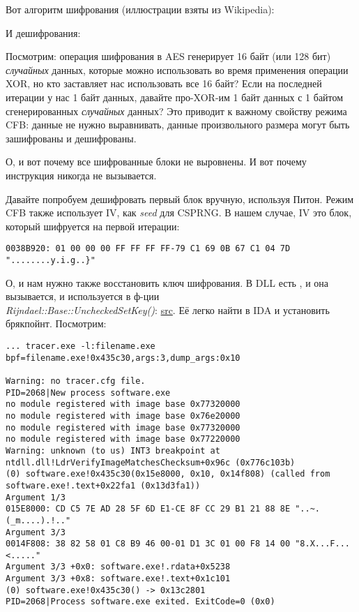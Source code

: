 Вот алгоритм шифрования (иллюстрации взяты из Wikipedia):

\begin{figure}[H]
\centering
{}
\end{figure}

И дешифрования:

\begin{figure}[H]
\centering
{}
\label{fig:CFB_decryption}
\end{figure}

Посмотрим: операция шифрования в AES генерирует 16 байт (или 128 бит) \emph{случайных} данных,
которые можно использовать во время применения операции XOR, но кто заставляет нас использовать все 16 байт?
Если на последней итерации у нас 1 байт данных, давайте про-XOR-им 1 байт данных с 1 байтом сгенерированных
\emph{случайных} данных?
Это приводит к важному свойству режима \ac{CFB}: данные не нужно выравнивать, данные произвольного размера
могут быть зашифрованы и дешифрованы.

О, и вот почему все шифрованные блоки не выровнены.
И вот почему инструкция  никогда не вызывается.

Давайте попробуем дешифровать первый блок вручную, используя Питон.
Режим \ac{CFB} также использует \ac{IV}, как \emph{seed} для \ac{CSPRNG}.
В нашем случае, \ac{IV} это блок, который шифруется на первой итерации:

\begin{lstlisting}
0038B920: 01 00 00 00 FF FF FF FF-79 C1 69 0B 67 C1 04 7D "........y.i.g..}"
\end{lstlisting}

О, и нам нужно также восстановить ключ шифрования.
В DLL есть , и она вызывается, и используется в ф-ции \\
\emph{Rijndael::Base::UncheckedSetKey()}:
\href{https://github.com/mmoss/cryptopp/blob/2772f7b57182b31a41659b48d5f35a7b6cedd34d/src/rijndael.cpp#L198}{src}.
Её легко найти в IDA и установить брякпойнт. Посмотрим:

\begin{lstlisting}
... tracer.exe -l:filename.exe bpf=filename.exe!0x435c30,args:3,dump_args:0x10

Warning: no tracer.cfg file.
PID=2068|New process software.exe
no module registered with image base 0x77320000
no module registered with image base 0x76e20000
no module registered with image base 0x77320000
no module registered with image base 0x77220000
Warning: unknown (to us) INT3 breakpoint at ntdll.dll!LdrVerifyImageMatchesChecksum+0x96c (0x776c103b)
(0) software.exe!0x435c30(0x15e8000, 0x10, 0x14f808) (called from software.exe!.text+0x22fa1 (0x13d3fa1))
Argument 1/3
015E8000: CD C5 7E AD 28 5F 6D E1-CE 8F CC 29 B1 21 88 8E "..~.(_m....).!.."
Argument 3/3
0014F808: 38 82 58 01 C8 B9 46 00-01 D1 3C 01 00 F8 14 00 "8.X...F...<....."
Argument 3/3 +0x0: software.exe!.rdata+0x5238
Argument 3/3 +0x8: software.exe!.text+0x1c101
(0) software.exe!0x435c30() -> 0x13c2801
PID=2068|Process software.exe exited. ExitCode=0 (0x0)
\end{lstlisting}

